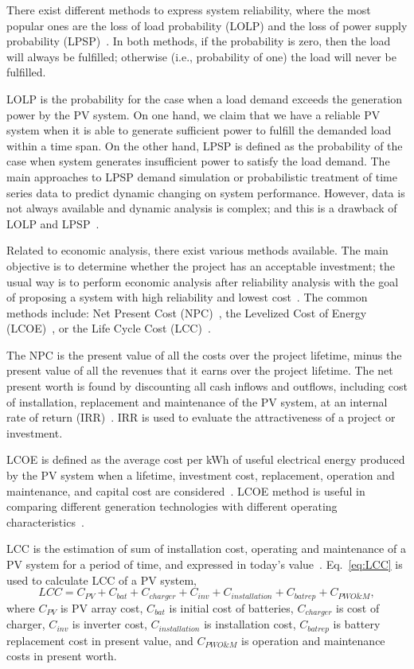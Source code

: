 \documentclass[review]{elsarticle}
\begin{document}
There exist different methods to express system reliability, where the most popular ones 
are the loss of load probability (LOLP) and the loss of power supply probability (LPSP)~\cite{Alsadi2018}. In both methods, if the probability is zero, then the load will always be fulfilled; otherwise (i.e., probability of one) the load will never be fulfilled.

LOLP is the probability for the case when a load demand exceeds the generation power by the PV system. On one hand, we claim that we have a reliable PV system when it is able to generate sufficient power to fulfill the demanded load within a time span. On the other hand, LPSP is defined as the probability of the case when system generates insufficient power to satisfy the load demand. The main approaches to LPSP demand simulation or probabilistic treatment of time series data to predict dynamic changing on system performance. However, data is not always available and dynamic analysis is complex; and this is a drawback of LOLP and LPSP~\cite{Alsadi2018}.

Related to economic analysis, there exist various methods available. The main objective is to determine whether the project has an acceptable investment; the usual way is to perform economic analysis after reliability analysis with the goal of proposing a system with high reliability and lowest cost~\cite{Alsadi2018}. The common methods include: Net Present Cost (NPC)~\cite{Park2004}, the Levelized Cost of Energy (LCOE)~\cite{Zhou2010}, or the Life Cycle Cost (LCC)~\cite{Applasamy2011}.

The NPC is the present value of all the costs over the project lifetime, minus the present value of all the revenues that it earns over the project lifetime. The net present worth is found by discounting all cash inflows and outflows, including cost of installation, replacement and maintenance of the PV system, at an internal rate of return (IRR)~\cite{Park2004}. IRR is used to evaluate the attractiveness of a project or investment.

LCOE is defined as the average cost per kWh of useful electrical energy produced by the PV system when a lifetime, investment cost, replacement, operation and maintenance, and capital cost are considered~\cite{Kamel2005}. LCOE method is useful in comparing different generation technologies with different operating characteristics~\cite{Zhou2010}.

LCC is the estimation of sum of installation cost, operating and maintenance of a PV system for a period of time, and expressed in today's value~\cite{Applasamy2011}. Eq.~\eqref{eq:LCC} is used to calculate LCC of a PV system,
%
\begin{equation}
\label{eq:LCC}
LCC = C_{PV} + C_{bat} + C_{charger} + C_{inv} + C_{installation} + C_{batrep} + C_{PWO\&M},
\end{equation}
\noindent where $C_{PV}$ is PV array cost, $C_{bat}$ is initial cost of batteries, $C_{charger}$ is cost of charger, $C_{inv}$ is inverter cost, $C_{installation}$ is installation cost, $C_{batrep}$ is battery replacement cost in present value, and $C_{PWO\&M}$ is operation and maintenance costs 
in present worth.
\end{document}
